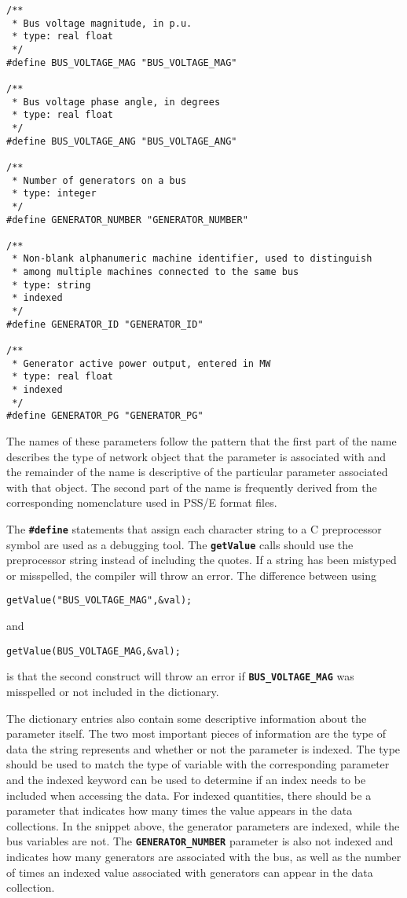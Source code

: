 {
\color{red}
\begin{Verbatim}[fontseries=b]
/**
 * Bus voltage magnitude, in p.u.
 * type: real float
 */
#define BUS_VOLTAGE_MAG "BUS_VOLTAGE_MAG"

/**
 * Bus voltage phase angle, in degrees
 * type: real float
 */
#define BUS_VOLTAGE_ANG "BUS_VOLTAGE_ANG"

/**
 * Number of generators on a bus
 * type: integer
 */
#define GENERATOR_NUMBER "GENERATOR_NUMBER"

/**
 * Non-blank alphanumeric machine identifier, used to distinguish
 * among multiple machines connected to the same bus  
 * type: string
 * indexed
 */
#define GENERATOR_ID "GENERATOR_ID"

/**
 * Generator active power output, entered in MW 
 * type: real float
 * indexed
 */
#define GENERATOR_PG "GENERATOR_PG"
\end{Verbatim}
}

The names of these parameters follow the pattern that the first part of the name describes the type of network object that the parameter is associated with and the remainder of the name is descriptive of the particular parameter associated with that object. The second part of the name is frequently derived from the corresponding nomenclature used in PSS/E format files.

The \texttt{\textbf{\#define}} statements that assign each character string to a C preprocessor symbol are used as a debugging tool. The \texttt{\textbf{getValue}} calls should use the preprocessor string instead of including the quotes. If a string has been mistyped or misspelled, the compiler will throw an error. The difference between using

{
\color{red}
\begin{Verbatim}[fontseries=b]
getValue("BUS_VOLTAGE_MAG",&val);
\end{Verbatim}
}

and

{
\color{red}
\begin{Verbatim}[fontseries=b]
getValue(BUS_VOLTAGE_MAG,&val);
\end{Verbatim}
}

is that the second construct will throw an error if \texttt{\textbf{BUS\_VOLTAGE\_MAG}} was misspelled or not included in the dictionary.

The dictionary entries also contain some descriptive information about the parameter itself. The two most important pieces of information are the type of data the string represents and whether or not the parameter is indexed. The type should be used to match the type of variable with the corresponding parameter and the indexed keyword can be used to determine if an index needs to be included when accessing the data. For indexed quantities, there should be a parameter that indicates how many times the value appears in the data collections. In the snippet above, the generator parameters are indexed, while the bus variables are not. The \texttt{\textbf{GENERATOR\_NUMBER}} parameter is also not indexed and indicates how many generators are associated with the bus, as well as the number of times an indexed value associated with generators can appear in the data collection.

